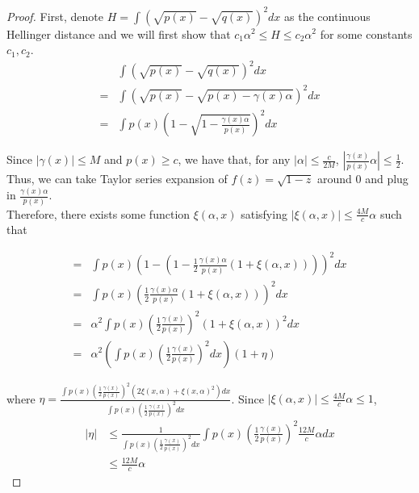 \documentclass{article}
\begin{document}
\begin{proof}

First, denote $H = \int (\sqrt{p(x)} - \sqrt{q(x)})^2 dx$ as the continuous Hellinger distance and we will first show that $c_1 \alpha^2 \leq H \leq c_2 \alpha^2$ for some constants $c_1, c_2$.\\

\begin{align*}
&\int (\sqrt{p(x)} - \sqrt{q(x)})^2 dx \\
=& \int ( \sqrt{p(x)} - \sqrt{p(x) - \gamma(x) \alpha} )^2 dx \\
=& \int p(x) \left( 1 - \sqrt{ 1 - \frac{\gamma(x) \alpha}{p(x)}} \right)^2 dx 
\end{align*}

Since $|\gamma(x)| \leq M$ and $p(x) \geq c$, we have that, for any $|\alpha| \leq \frac{c}{2M}$, $\left| \frac{\gamma(x)}{p(x)} \alpha \right| \leq \frac{1}{2}$. Thus, we can take Taylor series expansion of $f(z) = \sqrt{1 - z}$ around 0 and plug in $\frac{\gamma(x) \alpha}{p(x)}$. \\


Therefore, there exists some function $\xi(\alpha, x)$ satisfying $|\xi(\alpha, x)| \leq 
\frac{4M}{c} \alpha$ such that

\begin{align*}
=& \int p(x) \left( 1 - (1 - \frac{1}{2} \frac{\gamma(x) \alpha}{p(x)} (1 + \xi(\alpha, x)) ) \right)^2 dx \\
=& \int p(x) \left( \frac{1}{2} \frac{\gamma(x) \alpha}{p(x)} (1 + \xi(\alpha, x)) \right)^2 dx\\
=& \alpha^2 \int p(x) \left( \frac{1}{2} \frac{\gamma(x) }{p(x)} \right)^2 (1+\xi(\alpha, x))^2 dx \\
=& \alpha^2 \left( \int p(x) \left( \frac{1}{2} \frac{\gamma(x)}{p(x)} \right)^2 dx \right) (1 + \eta) 
\end{align*}

where $\eta = \frac{ \int p(x) \left( \frac{1}{2} \frac{\gamma(x)}{p(x)} \right)^2 ( 2 \xi(x, \alpha) + \xi(x, \alpha)^2 )  dx }
             { \int p(x) \left( \frac{1}{2} \frac{\gamma(x)}{p(x)} \right)^2 dx}$. Since $| \xi(\alpha, x) | \leq \frac{4M}{c} \alpha \leq 1$, 
\begin{align*}
|\eta| & 
\leq \frac{1}{ \int p(x) \left( \frac{1}{2} \frac{\gamma(x)}{p(x)} \right)^2 dx } 
  \int p(x) \left( \frac{1}{2} \frac{\gamma(x)}{p(x)} \right)^2 \frac{12 M}{c} \alpha dx \\
&\leq \frac{12 M}{c} \alpha
\end{align*} 


\end{proof}
\end{document}
